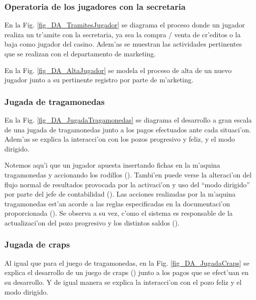 \subsubsection{Operatoria de los jugadores con la secretaria}
En la Fig. \ref{fig_DA_TramitesJugador} se diagrama el proceso donde un jugador realiza un tr'amite con la secretaria, ya sea la compra / venta de cr'editos o la baja como jugador del casino. Adem'as se muestran las actividades pertinentes que se realizan con el departamento de marketing. 


\clearpage

En la Fig. \ref{fig_DA_AltaJugador} se modela el proceso de alta de un nuevo jugador junto a su pertinente registro por parte de m'arketing.



\clearpage




\subsubsection{Jugada de tragamonedas}
En la Fig. \ref{fig_DA_JugadaTragamonedas} se diagrama el desarrollo a gran escala de una jugada de tragamonedas junto a los pagos efectuados ante cada situaci'on. Adem'as se explica la interacci'on con los pozos progresivo y feliz, y el modo dirigido.


Notemos aqu'i que un jugador apuesta insertando fichas en la m'aquina tragamonedas y accionando los rodillos ().
Tambi'en puede verse la alteraci'on del flujo normal de resultados provocada por la activaci'on y uso del ``modo dirigido'' por parte del jefe de contabilidad ().
Las acciones realizadas por la m'aquina tragamonedas est'an acorde a las reglas especificadas en la documentaci'on proporcionada ().
Se observa a su vez, c'omo el sistema es responsable de la actualizaci'on del pozo progresivo y los distintos saldos ().

\clearpage





\subsubsection{Jugada de craps}
Al igual que para el juego de tragamonedas, en la Fig. \ref{fig_DA_JugadaCraps} se explica el desarrollo de un juego de craps () junto a los pagos que se efect'uan en su desarrollo. Y de igual manera se explica la interacci'on con el pozo feliz y el modo dirigido.

